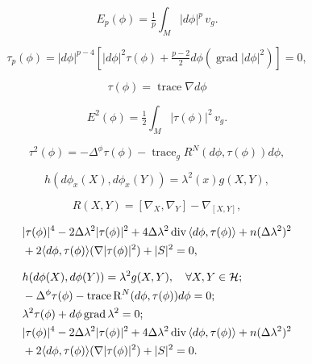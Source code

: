 \documentclass[12pt]{article}
\begin{document}
$$ E_{p}(\phi) = \tfrac{1}{p} \int_{M} |d\phi|^p \, v_{g} .$$

$$ \tau_{p}(\phi) = |d\phi|^{p-4} [|d\phi|^{2}\tau(\phi) + \tfrac{p-2}{2} d\phi(\operatorname{grad} |d\phi|^2)] =0  ,$$

$$ \tau(\phi) =  \operatorname{trace}{ \nabla d \phi } $$

$$ E^{2}(\phi) = \tfrac{1}{2} \int_{M} | \tau(\phi) |^{2} \, v_{g} .$$

$$ \tau^{2}(\phi) = - \Delta^{\phi} \tau(\phi) - \operatorname{trace}_{g}{R^{N}}(
d\phi, \tau(\phi) ) d\phi ,$$

$$ h( d\phi_{x}(X), d\phi_{x}(Y)) = \lambda^{2}(x) g(X,Y), $$

$$ R(X,Y) = [ \nabla_{X} , \nabla_{Y} ] - \nabla_{[X,Y]} ,$$

\begin{align}\label{longeq}
& |\tau(\phi)|^{4} - 2\Delta \lambda^{2} |\tau(\phi)|^{2} + 4 \Delta \lambda^{2}
\operatorname{div}{\langle d\phi , \tau(\phi)\rangle} + n (\Delta \lambda^{2})^{2} \\
& + 2 \langle d\phi , \tau(\phi) \rangle (\nabla |\tau(\phi)|^{2}) + |S|^{2} = 0 ,\notag
\end{align}

\begin{align}
 &h(d\phi(X),d\phi(Y)) = \lambda^{2} g(X,Y) ,\quad \forall X,Y \in {\mathcal{H}}
\label{eqa} ; \\
& - \Delta^{\phi}\tau(\phi) - \operatorname{trace}{{\mathrm R}^{N}(d\phi,
\tau(\phi))d\phi} = 0 \label{eqb};\\
&  \lambda^{2} \tau(\phi) + d\phi \operatorname{grad}{\lambda^{2}} = 0 \label{eqc}; \\
& |\tau(\phi)|^{4} - 2\Delta \lambda^{2} |\tau(\phi)|^{2} + 4 \Delta \lambda^{2}
\operatorname{div}{\langle d\phi , \tau(\phi)\rangle} + n (\Delta \lambda^{2})^{2} \label{eqd}\\
&+ 2 \langle d\phi
, \tau(\phi) \rangle (\nabla |\tau(\phi)|^{2}) + |S|^{2} = 0  .\notag
\end{align}
\end{document}
